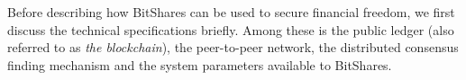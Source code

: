 Before describing how BitShares can be used to secure financial freedom, we
first discuss the technical specifications briefly. Among these is the public
ledger (also referred to as \emph{the blockchain}), the peer-to-peer network,
the distributed consensus finding mechanism and the system parameters available
to BitShares.
